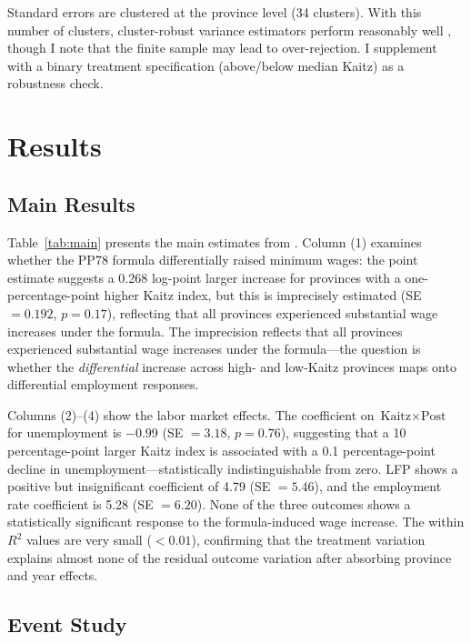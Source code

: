 \documentclass[12pt]{article}
\begin{document}
Standard errors are clustered at the province level (34 clusters). With this number of clusters, cluster-robust variance estimators perform reasonably well \citep{cameron2008bootstrap}, though I note that the finite sample may lead to over-rejection. I supplement with a binary treatment specification (above/below median Kaitz) as a robustness check.


\section{Results}
\label{sec:results}

\subsection{Main Results}

Table~\ref{tab:main} presents the main estimates from . Column (1) examines whether the PP78 formula differentially raised minimum wages: the point estimate suggests a 0.268 log-point larger increase for provinces with a one-percentage-point higher Kaitz index, but this is imprecisely estimated (SE $= 0.192$, $p = 0.17$), reflecting that all provinces experienced substantial wage increases under the formula. The imprecision reflects that all provinces experienced substantial wage increases under the formula---the question is whether the \textit{differential} increase across high- and low-Kaitz provinces maps onto differential employment responses.

Columns (2)--(4) show the labor market effects. The coefficient on $\text{Kaitz} \times \text{Post}$ for unemployment is $-0.99$ (SE $= 3.18$, $p = 0.76$), suggesting that a 10 percentage-point larger Kaitz index is associated with a 0.1 percentage-point decline in unemployment---statistically indistinguishable from zero. LFP shows a positive but insignificant coefficient of 4.79 (SE $= 5.46$), and the employment rate coefficient is 5.28 (SE $= 6.20$). None of the three outcomes shows a statistically significant response to the formula-induced wage increase. The within $R^2$ values are very small ($< 0.01$), confirming that the treatment variation explains almost none of the residual outcome variation after absorbing province and year effects.



\subsection{Event Study}
\end{document}
